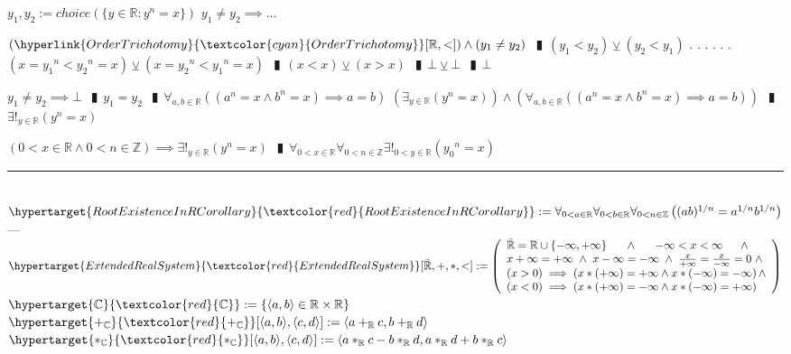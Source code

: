 \documentclass{book}
\newcommand{\df}[1]{\hypertarget{#1}{\textcolor{red}{#1}}}
\newcommand{\rf}[1]{\hyperlink{#1}{\textcolor{cyan}{#1}}}
\newcommand{\abr}{:=}
\newcommand{\cont}{\phantom{.}. . .\phantom{.}}
\newcommand{\pipe}{$\phantom{(}\vrectangleblack\phantom{)}$}
\newcommand{\pr}[1]{\left(#1\right)}
\begin{document}
\begin{enumerate}
\begin{enumerate}
    \lit $y_1, y_2 \abr choice(\{y \in \mathbb{R} : y^n = x\})$
    \lit $y_1 \neq y_2 \implies \ldots$
    \begin{enumerate}
      \lit $(\rf{OrderTrichotomy}[\mathbb{R}, <]) \land (y_1 \neq y_2)$ \pipe $(y_1 < y_2) \veebar (y_2 < y_1)$ \cont
      \lit \cont $(x = {y_1}^n < {y_2}^n = x) \veebar (x = {y_2}^n < {y_1}^n = x)$ \pipe $(x < x) \veebar (x > x)$ \pipe $\bot \veebar \bot$ \pipe $\bot$
    \end{enumerate}
    \lit $y_1 \neq y_2 \implies \bot$ \pipe $y_1 = y_2$ \pipe $\forall_{a, b \in \mathbb{R}}\pr{(a^n = x \land b^n = x) \implies a = b}$
    \lit $\pr{\exists_{y \in \mathbb{R}}(y^n = x)} \land \pr{\forall_{a, b \in \mathbb{R}}\pr{(a^n = x \land b^n = x) \implies a = b}}$ \pipe $\exists!_{y \in \mathbb{R}}(y^n = x)$
  \end{enumerate}
  \lit $(0 < x \in \mathbb{R} \land 0 < n \in \mathbb{Z}) \implies \exists!_{y \in \mathbb{R}}(y^n = x)$ \pipe $\forall_{0 < x \in \mathbb{R}} \forall_{0 < n \in \mathbb{Z}} \exists!_{0 < y \in \mathbb{R}}({y_0}^n = x)$
\end{enumerate} \vspace{.75mm} \hrule \vspace{.75mm} \ \\ 

$\df{RootExistenceInRCorollary} \abr \forall_{0 < a \in \mathbb{R}} \forall_{0 < b \in \mathbb{R}} \forall_{0 < n \in \mathbb{Z}}\pr{(a b)^{1 / n} = a^{1 / n} b^{1 / n}}$    \phantom{TODO}--- \\

$\df{ExtendedRealSystem}[\bar{\mathbb{R}}, +, *, <] \abr \left(\begin{array}{ll}
  \bar{\mathbb{R}} = \mathbb{R} \cup \{-\infty, +\infty\} \hfill \land \hfill -\infty < x < \infty \hfill \land \hfill \\
  x + \infty = +\infty \hfill \land \hfill x - \infty = -\infty \hfill \land \hfill \frac{x}{+\infty} = \frac{x}{-\infty} = 0 \hfill \land \hfill \\
  (x > 0) \implies \pr{x * (+\infty) = +\infty \land x *(-\infty) = -\infty} \hfill \land \hfill \\
  (x < 0) \implies \pr{x * (+\infty) = -\infty \land x *(-\infty) = +\infty}
\end{array}\right)$ \\

$\df{\mathbb{C}} \abr \{\langle a, b \rangle \in \mathbb{R} \times \mathbb{R}\}$ \\
$\df{+_{\mathbb{C}}}[\langle a, b \rangle, \langle c, d \rangle] \abr \langle a +_{\mathbb{R}} c, b +_{\mathbb{R}} d \rangle$ \\
$\df{*_{\mathbb{C}}}[\langle a, b \rangle, \langle c, d \rangle] \abr \langle a *_{\mathbb{R}} c - b *_{\mathbb{R}} d, a *_{\mathbb{R}} d + b *_{\mathbb{R}} c \rangle$ \\
\end{document}

